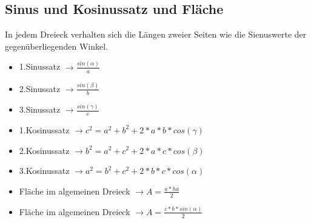 \newpage
\subsection{Sinus und Kosinussatz und Fläche}

\hfill \break
In jedem Dreieck verhalten sich die Längen zweier Seiten wie die Sienuswerte der gegenüberliegenden Winkel.

\hfill \break
\begin{itemize}
    \item 1.Sinussatz $\rightarrow \frac{sin(\alpha)}{a}$
    \item 2.Sinussatz $\rightarrow \frac{sin(\beta)}{b}$
    \item 3.Sinussatz $\rightarrow \frac{sin(\gamma)}{c}$
    \item 1.Kosinussatz $\rightarrow c^2 = a^2 + b^2 +2*a*b*cos(\gamma)$
    \item 2.Kosinussatz $\rightarrow b^2 = a^2 + c^2 +2*a*c*cos(\beta)$
    \item 3.Kosinussatz $\rightarrow a^2 = b^2 + c^2 +2*b*c*cos(\alpha)$
    \item Fläche im algemeinen Dreieck $\rightarrow A = \frac{a*ha}{2}$
    \item Fläche im algemeinen Dreieck $\rightarrow A = \frac{c*b*sin(\alpha)}{2}$
\end{itemize}
